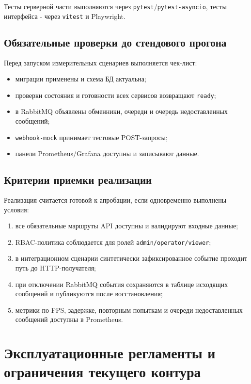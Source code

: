 Тесты серверной части выполняются через \texttt{pytest}/\texttt{pytest-asyncio}, тесты интерфейса - через \texttt{vitest} и Playwright.

\subsection{Обязательные проверки до стендового прогона}

Перед запуском измерительных сценариев выполняется чек-лист:
\begin{itemize}
    \item миграции применены и схема БД актуальна;
    \item проверки состояния и готовности всех сервисов возвращают \texttt{ready};
    \item в RabbitMQ объявлены обменники, очереди и очередь недоставленных сообщений;
    \item \texttt{webhook-mock} принимает тестовые POST-запросы;
    \item панели Prometheus/Grafana доступны и записывают данные.
\end{itemize}

\subsection{Критерии приемки реализации}

Реализация считается готовой к апробации, если одновременно выполнены условия:
\begin{enumerate}
    \item все обязательные маршруты API доступны и валидируют входные данные;
    \item RBAC-политика соблюдается для ролей \texttt{admin/operator/viewer};
    \item в интеграционном сценарии синтетически зафиксированное событие проходит путь до HTTP-получателя;
    \item при отключении RabbitMQ события сохраняются в таблице исходящих сообщений и публикуются после восстановления;
    \item метрики по FPS, задержке, повторным попыткам и очереди недоставленных сообщений доступны в Prometheus.
\end{enumerate}

\section{Эксплуатационные регламенты и ограничения текущего контура}

